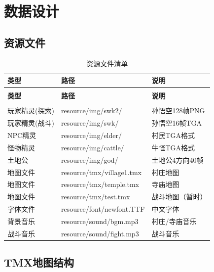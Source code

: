 \documentclass[12pt,a4paper]{article}
\begin{document}
\section{数据设计}

\subsection{资源文件}

\begin{longtable}{>{\centering\arraybackslash}m{2.5cm}>{\centering\arraybackslash}m{3.5cm}>{\centering\arraybackslash}m{5cm}}
\caption{资源文件清单} \label{tab:resources} \\
\toprule
\textbf{类型} & \textbf{路径} & \textbf{说明} \\
\midrule
\endfirsthead

\toprule
\multicolumn{3}{l}{续表} \\
\textbf{类型} & \textbf{路径} & \textbf{说明} \\
\midrule
\endhead

\midrule
\multicolumn{3}{r}{续下页} \\
\endfoot

\bottomrule
\endlastfoot

玩家精灵(探索) & resource/img/swk2/ & 孙悟空128帧PNG \\
玩家精灵(战斗) & resource/img/swk/ & 孙悟空16帧TGA \\
NPC精灵 & resource/img/elder/ & 村民TGA格式 \\
怪物精灵 & resource/img/cattle/ & 牛怪TGA格式 \\
土地公 & resource/img/god/ & 土地公4方向40帧 \\
地图文件 & resource/tmx/village1.tmx & 村庄地图 \\
地图文件 & resource/tmx/temple.tmx & 寺庙地图 \\
地图文件 & resource/tmx/test.tmx & 战斗地图（暂时） \\
字体文件 & resource/font/newfont.TTF & 中文字体 \\
背景音乐 & resource/sound/bgm.mp3 & 村庄/寺庙音乐 \\
战斗音乐 & resource/sound/fight.mp3 & 战斗音乐 \\
\end{longtable}

\subsection{TMX地图结构}
\end{document}
